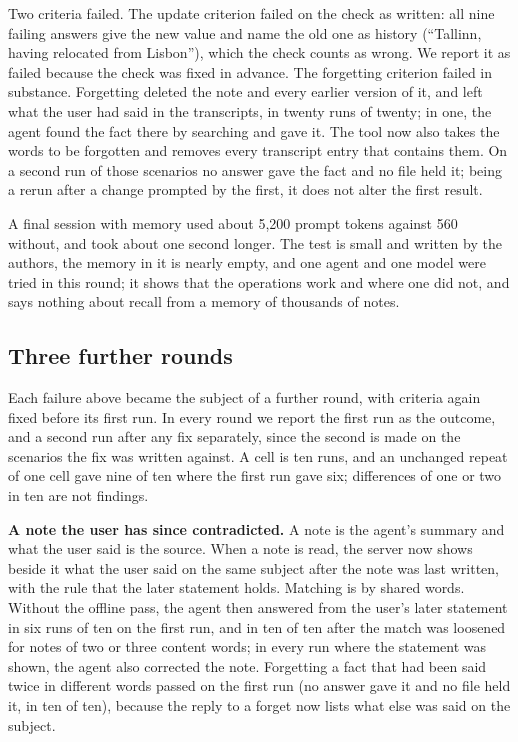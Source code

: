\documentclass[11pt,letterpaper]{article}
\begin{document}
Two criteria failed. The update criterion failed on the check as written: all nine failing answers give the new value and name the old one as history (``Tallinn, having relocated from Lisbon''), which the check counts as wrong. We report it as failed because the check was fixed in advance. The forgetting criterion failed in substance. Forgetting deleted the note and every earlier version of it, and left what the user had said in the transcripts, in twenty runs of twenty; in one, the agent found the fact there by searching and gave it. The tool now also takes the words to be forgotten and removes every transcript entry that contains them. On a second run of those scenarios no answer gave the fact and no file held it; being a rerun after a change prompted by the first, it does not alter the first result.

A final session with memory used about 5,200 prompt tokens against 560 without, and took about one second longer. The test is small and written by the authors, the memory in it is nearly empty, and one agent and one model were tried in this round; it shows that the operations work and where one did not, and says nothing about recall from a memory of thousands of notes.

\subsection{Three further rounds}

Each failure above became the subject of a further round, with criteria again fixed before its first run. In every round we report the first run as the outcome, and a second run after any fix separately, since the second is made on the scenarios the fix was written against. A cell is ten runs, and an unchanged repeat of one cell gave nine of ten where the first run gave six; differences of one or two in ten are not findings.

\textbf{A note the user has since contradicted.} A note is the agent's summary and what the user said is the source. When a note is read, the server now shows beside it what the user said on the same subject after the note was last written, with the rule that the later statement holds. Matching is by shared words. Without the offline pass, the agent then answered from the user's later statement in six runs of ten on the first run, and in ten of ten after the match was loosened for notes of two or three content words; in every run where the statement was shown, the agent also corrected the note. Forgetting a fact that had been said twice in different words passed on the first run (no answer gave it and no file held it, in ten of ten), because the reply to a forget now lists what else was said on the subject.
\end{document}
